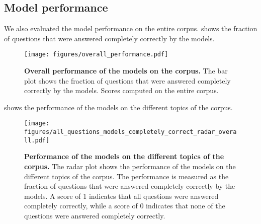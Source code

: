 

\subsection{Model performance}
We also evaluated the model performance on the entire \chembench corpus. 
 shows the fraction of questions that were answered completely correctly by the models. 

\begin{figure}[htb]
    \centering
    \texttt{[image: figures/overall\_performance.pdf]}
    \caption{\textbf{Overall performance of the models on the \chembench corpus.} The bar plot shows the fraction of questions that were answered completely correctly by the models. Scores computed on the entire \chembench corpus.}
    \label{fig:barplot_all_correct_all_questions}
\end{figure}

 shows the performance of the models on the different topics of the \chembench corpus.

\begin{figure}[htb]
    \centering
    \texttt{[image: figures/all\_questions\_models\_completely\_correct\_radar\_overall.pdf]}
    \caption{\textbf{Performance of the models on the different topics of the \chembench corpus.} The radar plot shows the performance of the models on the different topics of the \chembench corpus. The performance is measured as the fraction of questions that were answered completely correctly by the models.
    A score of 1 indicates that all questions were answered completely correctly, while a score of 0 indicates that none of the questions were answered completely correctly.
    }
    \label{fig:all_questions_models_completely_correct_radar_overall}
\end{figure}


